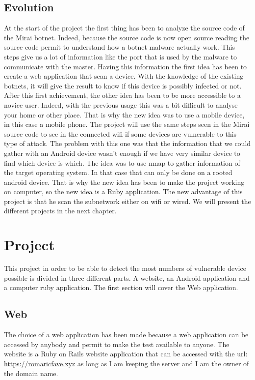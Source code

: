 \documentclass{report}
\begin{document}
\section{Evolution}
At the start of the project the first thing has been to analyze the source code of the Mirai botnet. Indeed, because the source code is now open source reading the source code permit to understand how a botnet malware actually work. This steps give us a lot of information like the port that is used by the malware to communicate with the master.\newline
Having this information the first idea has been to create a web application that scan a device. With the knowledge of the existing botnets, it will give the result to know if this device is possibly infected or not.\newline
After this first achievement, the other idea has been to be more accessible to a novice user. Indeed, with the previous usage this was a bit difficult to analyse your home or other place.\newline
That is why the new idea was to use a mobile device, in this case a mobile phone. The project will use the same steps seen in the Mirai source code to see in the connected wifi if some devices are vulnerable to this type of attack.\newline
The problem with this one was that the information that we could gather with an Android device wasn't enough if we have very similar device to find which device is which. The idea was to use nmap to gather information of the target operating system. In that case that can only be done on a rooted android device. That is why the new idea has been to make the project working on computer, so the new idea is a Ruby application. The new advantage of this project is that he scan the subnetwork either on wifi or wired.\newline
We will present the different projects in the next chapter.

\chapter{Project}
This project in order to be able to detect the most numbers of vulnerable device possible is divided in three different parts. A website, an Android application and a computer ruby application. The first section will cover the Web application.
\section{Web}
The choice of a web application has been made because a web application can be accessed by anybody and permit to make the test available to anyone. The website is a Ruby on Rails website application that can be accessed with the url: \url{https://romaricfave.xyz} as long as I am keeping the server and I am the owner of the domain name.\newline
\end{document}
